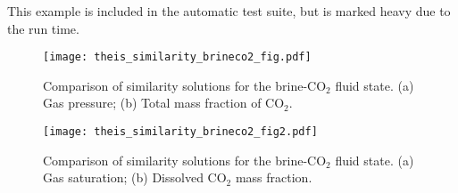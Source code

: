\documentclass[]{report}
\begin{document}
This example is included in the automatic test suite, but is marked heavy due to the
run time.

\begin{figure}[htb]
\centering
\texttt{[image: theis\_similarity\_brineco2\_fig.pdf]}
\caption{Comparison of similarity solutions for the brine-CO$_2$ fluid state.
(a) Gas pressure; (b) Total mass fraction of CO$_2$.}
\label{fig:theis_similarity_brineco2_fig}
\end{figure}

\begin{figure}[htb]
\centering
\texttt{[image: theis\_similarity\_brineco2\_fig2.pdf]}
\caption{Comparison of similarity solutions for the brine-CO$_2$ fluid state.
(a) Gas saturation; (b) Dissolved CO$_2$ mass fraction.}
\label{fig:theis_similarity_brineco2_fig2}
\end{figure}
\end{document}
